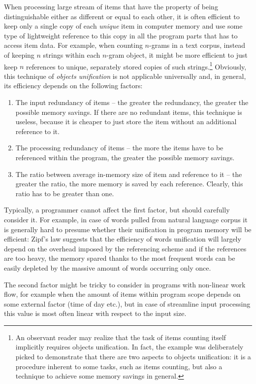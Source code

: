 When processing large stream of items that have the property of being distinguishable
either as different or equal to each other, it is often efficient to keep only a single
copy of each \emph{unique} item in computer memory and use some type of lightweight
reference to this copy in all the program parts that has to access item data.
For example, when counting $n$-grams in a text corpus, instead of keeping $n$ strings
within each $n$-gram object, it might be more efficient to just keep $n$ references to
unique, separately stored copies of such strings.\footnote{An observant reader may realize
that the task of items counting itself implicitly requires objects unification. In fact,
the example was deliberately picked to demonstrate that there are two aspects to objects
unification: it is a procedure inherent to some tasks, such as items counting, but also
a technique to achieve some memory savings in general.}
Obviously, this technique of \emph{objects unification} is not applicable universally and,
in general, its efficiency depends on the following factors:
\begin{enumerate}
  \item The input redundancy of items -- the greater the redundancy, the greater
  the possible memory savings. If there are no redundant items, this technique is useless,
  because it is cheaper to just store the item without an additional reference to it.
  \item The processing redundancy of items -- the more the items have to be
  referenced within the program, the greater the possible memory savings.
  \item The ratio between average in-memory size of item and reference to it -- the greater
  the ratio, the more memory is saved by each reference.
  Clearly, this ratio has to be greater than one.
\end{enumerate}

Typically, a programmer cannot affect the first factor, but should carefully consider it.
For example, in case of words pulled from natural language corpus it is generally hard to
presume whether their unification in program memory will be efficient:
Zipf's law \citep[Chapter 1]{manning:stat-nlp} suggests that the efficiency of words unification
will largely depend on the overhead imposed by the referencing scheme and if the references are
too heavy, the memory spared thanks to the most frequent words can be easily depleted by
the massive amount of words occurring only once.

The second factor might be tricky to consider in programs with non-linear work flow,
for example when the amount of items within program scope depends on some external
factor (time of day etc.), but in case of streamline input processing this value is
most often linear with respect to the input size.

